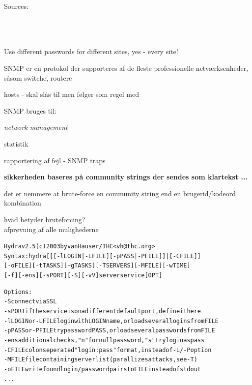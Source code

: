 \documentclass[20pt,landscape,a4paper,footrule]{foils}
\begin{document}
 Sources:\\
{\footnotesize{}\\
\\
\\
}

\vskip 5mm
\centerline{Use different passwords for different sites, yes - every site!}


\begin{list1}
\item SNMP er en protokol der supporteres af de fleste professionelle
  netværksenheder, såsom switche, routere
\item hosts - skal slås til men følger som regel med
\item SNMP bruges til:
  \begin{list2}
    \item \emph{network management}
    \item statistik
    \item rapportering af fejl - SNMP traps
  \end{list2}
\item {\bfseries sikkerheden baseres på community strings der sendes
    som klartekst ...}
\item det er nemmere at brute-force en community string end en
  brugerid/kodeord kombination
\end{list1}


\begin{list1}
\item hvad betyder bruteforcing?\\
afprøvning af alle mulighederne
\end{list1}

\begin{alltt}
\small
Hydra v2.5 (c) 2003 by van Hauser / THC <vh@thc.org>
Syntax: hydra [[[-l LOGIN|-L FILE] [-p PASS|-P FILE]] | [-C FILE]]
[-o FILE] [-t TASKS] [-g TASKS] [-T SERVERS] [-M FILE] [-w TIME]
[-f] [-e ns] [-s PORT] [-S] [-vV] server service [OPT]

Options:
  -S        connect via SSL
  -s PORT   if the service is on a different default port, define it here
  -l LOGIN  or -L FILE login with LOGIN name, or load several logins from FILE
  -p PASS   or -P FILE try password PASS, or load several passwords from FILE
  -e ns     additional checks, "n" for null password, "s" try login as pass
  -C FILE   colon seperated "login:pass" format, instead of -L/-P option
  -M FILE   file containing server list (parallizes attacks, see -T)
  -o FILE   write found login/password pairs to FILE instead of stdout
...
\end{alltt}
\end{document}
